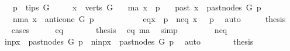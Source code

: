 \begin{isabellebody}
\ \ \ {\isachardoublequoteopen}p\ {\isasymin}\ tips\ G{\isachardoublequoteclose}\isanewline
\ \ \ \ \ {\isachardoublequoteopen}x\ {\isasymin}\ verts\ G{\isachardoublequoteclose}\isanewline
\ \ \ {\isacharparenleft}{\kern0pt}ma{\isacharparenright}{\kern0pt}\ {\isachardoublequoteopen}x\ {\isacharequal}{\kern0pt}\ p{\isachardoublequoteclose}\isanewline
\ \ {\isacharbar}{\kern0pt}\ {\isacharparenleft}{\kern0pt}past{\isacharparenright}{\kern0pt}\ {\isachardoublequoteopen}x\ {\isasymin}\ past{\isacharunderscore}{\kern0pt}nodes\ G\ p{\isachardoublequoteclose}\isanewline
\ \ {\isacharbar}{\kern0pt}\ {\isacharparenleft}{\kern0pt}nma{\isacharparenright}{\kern0pt}\ {\isachardoublequoteopen}x\ {\isasymin}\ anticone\ G\ p{\isachardoublequoteclose}\ \ \ \ \ \ \isanewline
%
\isadelimproof
%
\endisadelimproof
%
\isatagproof
{}\isamarkupfalse%
\ {\isacharminus}{\kern0pt}\isanewline
\ \ \isamarkupfalse%
\ {\isacharparenleft}{\kern0pt}eq{\isacharparenright}{\kern0pt}{\isachardoublequoteopen}x\ {\isacharequal}{\kern0pt}\ p{\isachardoublequoteclose}\ {\isacharbar}{\kern0pt}\ {\isacharparenleft}{\kern0pt}neq{\isacharparenright}{\kern0pt}\ {\isachardoublequoteopen}{\isasymnot}x\ {\isacharequal}{\kern0pt}\ \ p{\isachardoublequoteclose}\ \isamarkupfalse%
\ auto\isanewline
\ \ \isamarkupfalse%
\ \isamarkupfalse%
\ {\isacharquery}{\kern0pt}thesis\isanewline
\ \ \isamarkupfalse%
{\isacharparenleft}{\kern0pt}cases{\isacharparenright}{\kern0pt}\isanewline
\ \ \ \ \isamarkupfalse%
\ eq\isanewline
\ \ \ \ \isamarkupfalse%
\ \isamarkupfalse%
\ thesis\ \isamarkupfalse%
\ eq\ ma\ \isamarkupfalse%
\ simp\isanewline
\ \ \isamarkupfalse%
\isanewline
\ \ \ \ \isamarkupfalse%
\ neq\isanewline
\ \ \ \ \isamarkupfalse%
\ {\isacharparenleft}{\kern0pt}in{\isacharunderscore}{\kern0pt}p{\isacharparenright}{\kern0pt}{\isachardoublequoteopen}x\ {\isasymin}\ past{\isacharunderscore}{\kern0pt}nodes\ G\ p{\isachardoublequoteclose}\ {\isacharbar}{\kern0pt}\ {\isacharparenleft}{\kern0pt}nin{\isacharunderscore}{\kern0pt}p{\isacharparenright}{\kern0pt}{\isachardoublequoteopen}x\ {\isasymnotin}\ past{\isacharunderscore}{\kern0pt}nodes\ G\ p{\isachardoublequoteclose}\ \isamarkupfalse%
\ auto\isanewline
\ \ \ \ \isamarkupfalse%
\ \isamarkupfalse%
\ {\isacharquery}{\kern0pt}thesis\ \isanewline

\end{isabellebody}
